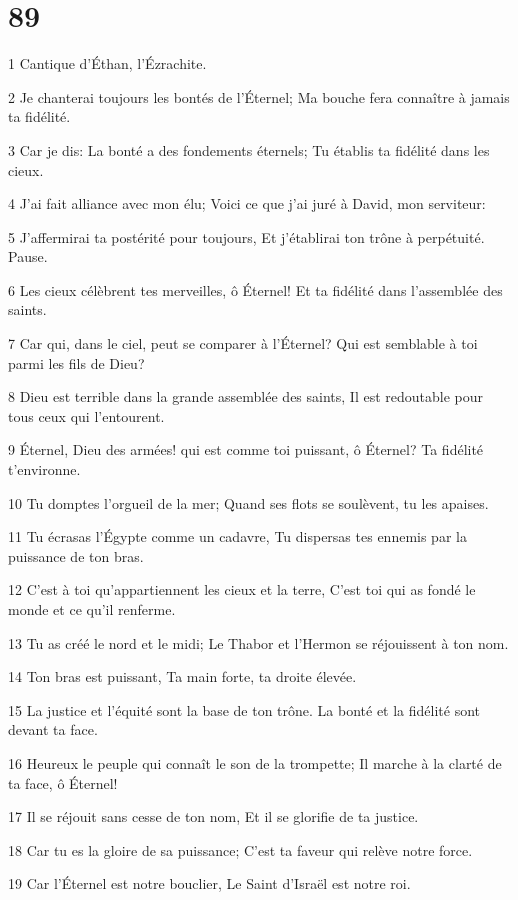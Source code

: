 \chapter{89}

\par 1 Cantique d'Éthan, l'Ézrachite.
\par 2 Je chanterai toujours les bontés de l'Éternel; Ma bouche fera connaître à jamais ta fidélité.
\par 3 Car je dis: La bonté a des fondements éternels; Tu établis ta fidélité dans les cieux.
\par 4 J'ai fait alliance avec mon élu; Voici ce que j'ai juré à David, mon serviteur:
\par 5 J'affermirai ta postérité pour toujours, Et j'établirai ton trône à perpétuité. Pause.
\par 6 Les cieux célèbrent tes merveilles, ô Éternel! Et ta fidélité dans l'assemblée des saints.
\par 7 Car qui, dans le ciel, peut se comparer à l'Éternel? Qui est semblable à toi parmi les fils de Dieu?
\par 8 Dieu est terrible dans la grande assemblée des saints, Il est redoutable pour tous ceux qui l'entourent.
\par 9 Éternel, Dieu des armées! qui est comme toi puissant, ô Éternel? Ta fidélité t'environne.
\par 10 Tu domptes l'orgueil de la mer; Quand ses flots se soulèvent, tu les apaises.
\par 11 Tu écrasas l'Égypte comme un cadavre, Tu dispersas tes ennemis par la puissance de ton bras.
\par 12 C'est à toi qu'appartiennent les cieux et la terre, C'est toi qui as fondé le monde et ce qu'il renferme.
\par 13 Tu as créé le nord et le midi; Le Thabor et l'Hermon se réjouissent à ton nom.
\par 14 Ton bras est puissant, Ta main forte, ta droite élevée.
\par 15 La justice et l'équité sont la base de ton trône. La bonté et la fidélité sont devant ta face.
\par 16 Heureux le peuple qui connaît le son de la trompette; Il marche à la clarté de ta face, ô Éternel!
\par 17 Il se réjouit sans cesse de ton nom, Et il se glorifie de ta justice.
\par 18 Car tu es la gloire de sa puissance; C'est ta faveur qui relève notre force.
\par 19 Car l'Éternel est notre bouclier, Le Saint d'Israël est notre roi.
